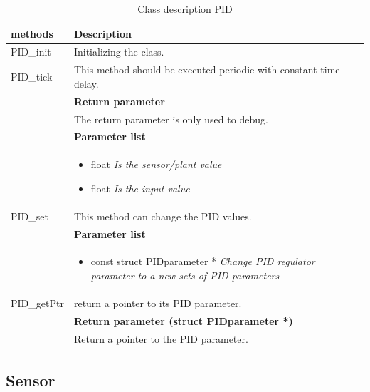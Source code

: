 \begin{table}[H]
	\centering
	\begin{tabular}{|p{5 cm}|p{10 cm}|}
		\hline
		\textbf{methods} & \textbf{Description} \\ \hline
		
		PID\_init
		& Initializing the class. 
		\\ \hline
		
		PID\_tick
		& This method should be executed periodic with constant time delay. 
		\\ & \textbf{Return parameter}
		\\ & The return parameter is only used to debug.
		\\ & \textbf{Parameter list}
		\\ & \begin{itemize}
			\item {\large float}
			\subitem \textit{Is the sensor/plant value}
			\item {\large float}
			\subitem \textit{Is the input value}
		\end{itemize}
		\\ \hline
		
		PID\_set
		& This method can change the PID values.
		\\ & \textbf{Parameter list}
		\\ & \begin{itemize}
			\item {\large const struct PIDparameter *}
			\subitem \textit{Change PID regulator parameter to a new sets of PID parameters}
		\end{itemize} 
		\\ \hline
		
		PID\_getPtr
		& return a pointer to its PID parameter.
		\\ & \textbf{Return parameter (struct PIDparameter *)}
		\\ & Return a pointer to the PID parameter. 
		\\ \hline
		
	\end{tabular}
	\caption{Class description PID}
	\label{table:Class_description_PID_RR_PSoC}
\end{table}

\subsection{Sensor} 

